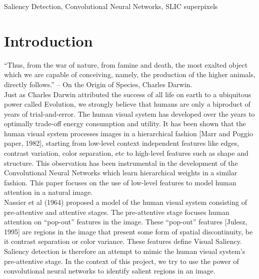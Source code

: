 \documentclass[journal]{IEEEtran}
\begin{document}
\begin{IEEEkeywords}
Saliency Detection, Convolutional Neural Networks, SLIC superpixels  
\end{IEEEkeywords}

\IEEEpeerreviewmaketitle

\section{Introduction}
\label{sec1}
“Thus, from the war of nature, from famine and death, the most exalted object which we are capable of conceiving, namely, the production of the higher animals, directly follows.” – On the Origin of Species, Charles Darwin. \\

Just as Charles Darwin attributed the success of all life on earth to a ubiquitous power called Evolution, we strongly believe that humans are only a biproduct of years of trial-and-error. The human visual system has developed over the years to optimally trade-off energy consumption and utility. It has been shown that the human visual system processes images in a hierarchical fashion [Marr and Poggio paper, 1982], starting from low-level context independent features like edges, contrast variation, color separation, etc to high-level features such as shape and structure. This observation has been instrumental in the development of the Convolutional Neural Networks which learn hierarchical weights in a similar fashion. This paper focuses on the use of low-level features to model human attention in a natural image.\\
 
Nassier et al (1964) proposed a model of the human visual system consisting of pre-attentive and attentive stages. The pre-attentive stage focuses human attention on “pop-out” features in the image. These “pop-out” features [Julesz, 1995] are regions in the image that present some form of spatial discontinuity, be it contrast separation or color variance. These features define Visual Saliency. Saliency detection is therefore an attempt to mimic the human visual system’s pre-attentive stage. In the context of this project, we try to use the power of convolutional neural networks to identify salient regions in an image. \\
\end{document}
